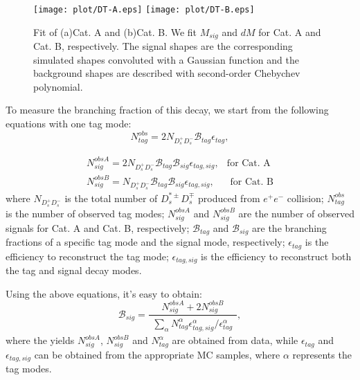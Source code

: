 {    \begin{figure*}[!htbp]
        \centering
        \texttt{[image: plot/DT-A.eps]}
        \texttt{[image: plot/DT-B.eps]}
        \caption{Fit of (a)Cat. A and (b)Cat. B.
            We fit $M_{sig}$ and $dM$ for Cat. A and Cat. B, respectively. The signal shapes are the corresponding simulated shapes convoluted with a Gaussian function and 
        the background shapes are described with second-order Chebychev polynomial.}
        \label{DT-fit}
    \end{figure*}

    To measure the branching fraction of this decay, we start from the following equations with one tag mode:
    \begin{equation}
        N_{tag}^{obs} = 2N_{D_{s}^{+}D_{s}^{-}}\mathcal{B}_{tag}\epsilon_{tag}, \label{eq-ST}
    \end{equation}

    \begin{equation}
        \begin{array}{lr}
            N_{sig}^{obsA}=2N_{D_{s}^{+}D_{s}^{-}}\mathcal{B}_{tag}\mathcal{B}_{sig}\epsilon_{tag,sig}  , &\text{for Cat. A} \\
            N_{sig}^{obsB}=N_{D_{s}^{+}D_{s}^{-}}\mathcal{B}_{tag}\mathcal{B}_{sig}\epsilon_{tag,sig}  ,  &\text{  for Cat. B}  
        \end{array}
        \label{eq-DT}
    \end{equation}
    where $N_{D_{s}^{+}D_{s}^{-}}$ is the total number of $D_{s}^{*\pm}D_{s}^{\mp}$ produced from $e^{+}e^{-}$ collision; $N_{tag}^{obs}$ is the number of observed tag modes; $N_{sig}^{obsA}$ and $N_{sig}^{obsB}$ are the number of observed signals for Cat. A and Cat. B, respectively; $\mathcal{B}_{tag}$ and $\mathcal{B}_{sig}$ are the branching fractions of a specific tag mode and the signal mode, respectively; $\epsilon_{tag}$ is the efficiency to reconstruct the tag mode; $\epsilon_{tag,sig}$ is the efficiency to reconstruct both the tag and signal decay modes.

    Using the above equations, it's easy to obtain:
    \begin{equation}
    \mathcal{B}_{sig} = \frac{N_{sig}^{obsA}+2N_{sig}^{obsB}}{\begin{matrix}\sum_{\alpha} N_{tag}^{\alpha}\epsilon_{tag,sig}^{\alpha}/\epsilon_{tag}^{\alpha}\end{matrix}}, \label{BR-formula}
    \end{equation}
    where the yields $N_{sig}^{obsA}$, $N_{sig}^{obsB}$ and $N_{tag}^{\alpha}$ are obtained from data, while $\epsilon_{tag}$ and $\epsilon_{tag,sig}$ can be obtained from the appropriate MC samples, where $\alpha$ represents the tag modes.
    

}
